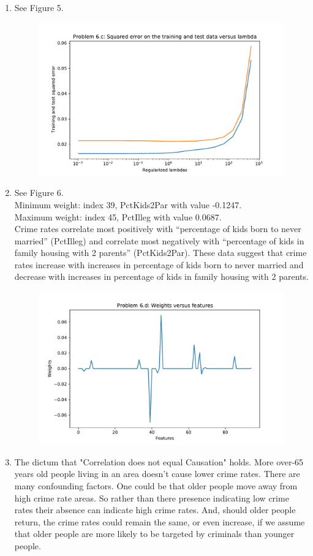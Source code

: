 \begin{enumerate}
    \item See Figure 5.
	\begin{figure}[h!]
	    \centering
	    \includegraphics[width=0.5\linewidth]{images/P6_c.pdf}
	    \caption{}
	\end{figure}
    \item See Figure 6. \\
	Minimum weight: index 39, PctKids2Par with value -0.1247.\\
	Maximum weight: index 45, PctIlleg with value 0.0687.\\
	Crime rates correlate most positively with ``percentage of kids born to never married'' (PctIlleg) and correlate most negatively with ``percentage of kids in family housing with 2 parents'' (PctKids2Par). These data suggest that crime rates increase with increases in percentage of kids born to never married and decrease with increases in percentage of kids in family housing with 2 parents.
	\begin{figure}[h!]
	    \centering
	    \includegraphics[width=0.5\linewidth]{images/P6_d.pdf}
	    \caption{}
	\end{figure}
    \item The dictum that "Correlation does not equal Causation" holds. More over-65 years old people living in an area doesn't cause lower crime rates. There are many confounding factors. One could be that older people move away from high crime rate areas. So rather than there presence indicating low crime rates their absence can indicate high crime rates. And, should older people return, the crime rates could remain the same, or even increase, if we assume that older people are more likely to be targeted by criminals than younger people. 
\end{enumerate}
